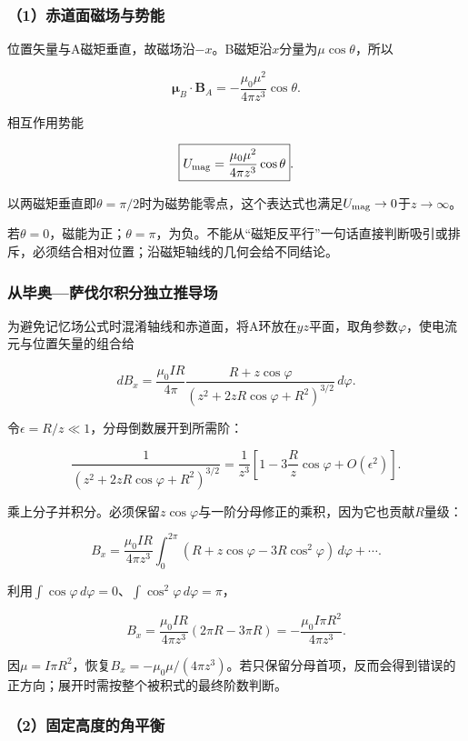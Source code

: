\documentclass[12pt,a4paper,fontset=fandol]{ctexart}
\begin{document}
\subsubsection{（1）赤道面磁场与势能}\label{ux8d64ux9053ux9762ux78c1ux573aux4e0eux52bfux80fd}

位置矢量与A磁矩垂直，故磁场沿\(-x\)。B磁矩沿\(x\)分量为\(\mu\cos\theta\)，所以

\[
\boldsymbol\mu_B\cdot\boldsymbol B_A
=-\frac{\mu_0\mu^2}{4\pi z^3}\cos\theta.
\]

相互作用势能

\[
\boxed{U_{\rm mag}=\frac{\mu_0\mu^2}{4\pi z^3}\cos\theta}.
\]

以两磁矩垂直即\(\theta=\pi/2\)时为磁势能零点，这个表达式也满足\(U_{\rm mag}\to0\)于\(z\to\infty\)。

若\(\theta=0\)，磁能为正；\(\theta=\pi\)，为负。不能从``磁矩反平行''一句话直接判断吸引或排斥，必须结合相对位置；沿磁矩轴线的几何会给不同结论。

\subsubsection{从毕奥---萨伐尔积分独立推导场}\label{ux4eceux6bd5ux5965ux8428ux4f10ux5c14ux79efux5206ux72ecux7acbux63a8ux5bfcux573a}

为避免记忆场公式时混淆轴线和赤道面，将A环放在\(yz\)平面，取角参数\(\varphi\)，使电流元与位置矢量的组合给

\[
dB_x=\frac{\mu_0IR}{4\pi}
\frac{R+z\cos\varphi}
{(z^2+2zR\cos\varphi+R^2)^{3/2}}\,d\varphi.
\]

令\(\epsilon=R/z\ll1\)，分母倒数展开到所需阶：

\[
\frac1{(z^2+2zR\cos\varphi+R^2)^{3/2}}
=\frac1{z^3}
\left[1-3\frac Rz\cos\varphi+O(\epsilon^2)\right].
\]

乘上分子并积分。必须保留\(z\cos\varphi\)与一阶分母修正的乘积，因为它也贡献\(R\)量级：

\[
B_x=\frac{\mu_0IR}{4\pi z^3}
\int_0^{2\pi}(R+z\cos\varphi-3R\cos^2\varphi)\,d\varphi+\cdots.
\]

利用\(\int\cos\varphi\,d\varphi=0\)、\(\int\cos^2\varphi\,d\varphi=\pi\)，

\[
B_x=\frac{\mu_0IR}{4\pi z^3}(2\pi R-3\pi R)
=-\frac{\mu_0I\pi R^2}{4\pi z^3}.
\]

因\(\mu=I\pi R^2\)，恢复\(B_x=-\mu_0\mu/(4\pi z^3)\)。若只保留分母首项，反而会得到错误的正方向；展开时需按整个被积式的最终阶数判断。

\subsubsection{（2）固定高度的角平衡}\label{ux56faux5b9aux9ad8ux5ea6ux7684ux89d2ux5e73ux8861}
\end{document}
